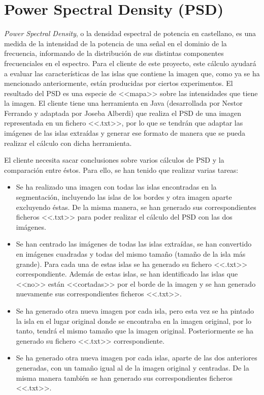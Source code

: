 \section{Power Spectral Density (PSD)}

\textit{Power Spectral Density}, o la densidad espectral de potencia en castellano, es una medida de la intensidad de la potencia de una se\~{n}al en el dominio de la frecuencia, informando de la distribuci\'{o}n de sus distintas componentes frecuenciales en el espectro. Para el cliente de este proyecto, este c\'{a}lculo ayudar\'{a} a evaluar las caracter\'{i}sticas de las islas que contiene la imagen que, como ya se ha mencionado anteriormente, est\'{a}n producidas por ciertos experimentos. El resultado del PSD es una especie de <<mapa>> sobre las intensidades que tiene la imagen. El cliente tiene una herramienta en Java (desarrollada por Nestor Ferrando y adaptada por Joseba Alberdi) que realiza el PSD de una imagen representada en un fichero <<.txt>>, por lo que se tendr\'{a}n que adaptar las im\'{a}genes de las islas extra\'{i}das y generar ese formato de manera que se pueda realizar el c\'{a}lculo con dicha herramienta.

El cliente necesita sacar conclusiones sobre varios c\'{a}lculos de PSD y la comparaci\'{o}n entre \'{e}stos. Para ello, se han tenido que realizar varias tareas:

\begin{itemize}
	\item Se ha realizado una imagen con todas las islas encontradas en la segmentaci\'{o}n, incluyendo las islas de los bordes y otra imagen aparte excluyendo \'{e}stas. De la misma manera, se han generado sus correspondientes ficheros <<.txt>> para poder realizar el c\'{a}lculo del PSD con las dos im\'{a}genes.
	\item Se han centrado las im\'{a}genes de todas las islas extra\'{i}das, se han convertido en im\'{a}genes cuadradas y todas del mismo tama\~{n}o (tama\~{n}o de la isla m\'{a}s grande). Para cada una de estas islas se ha generado su fichero <<.txt>> correspondiente. Adem\'{a}s de estas islas, se han identificado las islas que <<no>> est\'{a}n <<cortadas>> por el borde de la imagen y se han generado nuevamente sus correspondientes ficheros <<.txt>>.
	\item Se ha generado otra nueva imagen por cada isla, pero esta vez se ha pintado la isla en el lugar original donde se encontraba en la imagen original, por lo tanto, tendr\'{a} el mismo tama\~{n}o que la imagen original. Posteriormente se ha generado su fichero <<.txt>> correspondiente.
	\item Se ha generado otra nueva imagen por cada islas, aparte de las dos anteriores generadas, con un tama\~{n}o igual al de la imagen original y centradas. De la misma manera tambi\'{e}n se han generado sus correspondientes ficheros <<.txt>>.  
\end{itemize}

